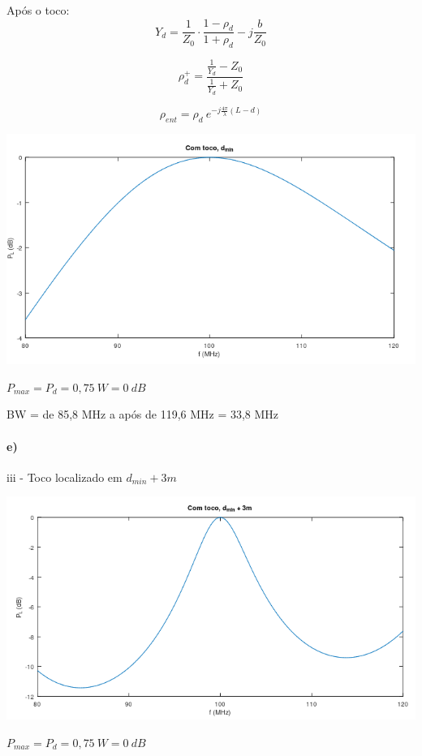 \documentclass[12pt,a4paper]{article}
\begin{document}
Após o toco:
$$Y_d = \frac{1}{Z_0}\cdot \frac{1-\rho_d}{1+\rho_d} - j\frac{b}{Z_0}$$

$$\rho_d^+=\frac{\frac{1}{Y_d}-Z_0}{\frac{1}{Y_d}+Z_0}$$

$$\rho_{ent}=\rho_d\ e^{-j\frac{4\pi}{\lambda}(L-d)}$$

\begin{center}
    \includegraphics[scale=0.65]{e ii.png}
\end{center}

$P_{max}=P_d=0,75\ W=0\ dB$


BW = de 85,8 MHz a após de 119,6 MHz = 33,8 MHz

\paragraph{e)} iii - Toco localizado em $d_{min}+3m$

\begin{center}
    \includegraphics[scale=0.65]{e iii.png}
\end{center}

$P_{max}=P_d=0,75\ W=0\ dB$
\end{document}
